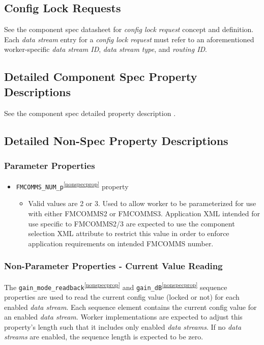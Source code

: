 \documentclass{article}
\begin{document}
  \subsection{Config Lock Requests}
    See the component spec datasheet for
    \textit{config lock request}
    concept and definition\cite{dig_radio_ctrlr_comp_datasheet}.
    Each \textit{data stream} entry for a \textit{config lock request} must
    refer to an
    aforementioned worker-specific \textit{data stream ID},
    \textit{data stream type}, and \textit{routing ID}.


  \subsection{Detailed Component Spec Property Descriptions}

    See the component spec detailed property
    description \cite{dig_radio_ctrlr_comp_datasheet}.

  \subsection{Detailed Non-Spec Property Descriptions}
    \label{sec:detailed_property_description}

    \subsubsection{Parameter Properties}
      \begin{itemize}
        \item \verb+FMCOMMS_NUM_p+\textsuperscript{\ref{nonspecprop}} property
          \begin{itemize}
            \item Valid values are 2 or 3. Used to allow worker to be parameterized
              for use with either FMCOMMS2 or FMCOMMS3.
              Application XML intended for use specific to FMCOMMS2/3 are expected
              to use the component selection XML attribute to restrict this
              value in order to
              enforce
              application requirements on intended FMCOMMS number.

          \end{itemize}
        \end{itemize}

    \subsubsection{Non-Parameter Properties - Current Value Reading}
    The
    \verb+gain_mode_readback+\textsuperscript{\ref{nonspecprop}} and
    \verb+gain_dB+\textsuperscript{\ref{nonspecprop}}
    sequence properties are used to read the current config value
    (locked or not) for each enabled \textit{data stream}. Each
    sequence element contains the current config value for an enabled
    \textit{data stream}. Worker implementations are expected to
    adjust this property's
    length such that it includes only enabled \textit{data streams}.
    If no \textit{data streams}
    are enabled, the sequence length is expected to be zero.
\end{document}
